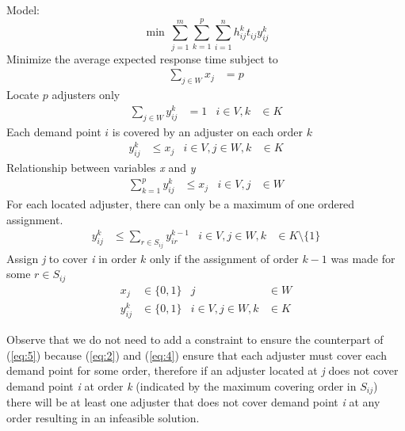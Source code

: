 Model:
{\small
  \begin{equation}
    \min \, \sum_{j=1}^{m}{
      \sum_{k=1}^{p}{
        \sum_{i=1}^{n}{
          h_{ij}^{k}t_{ij}y_{ij}^{k}
        }
      }
    }
  \end{equation}
}
Minimize the average expected response time
subject to
\begin{align}
  \label{eq:2}
  \sum_{j \in W}{x_j}
  & = p
\end{align}
Locate $p$ adjusters only
\begin{align}
  \label{eq:3}
  \sum_{j \in W}{y_{ij}^{k}}
  & = 1
  & i \in V, k
  &\in K
\end{align}
Each demand point $i$ is covered by an adjuster on each order $k$
\begin{align}
  \label{eq:4}
  y_{ij}^{k}
  & \leq x_j
  & i \in V,j \in W, k
  &\in K
\end{align}
Relationship between variables \textit{x} and \textit{y}
\begin{align}
  \label{eq:5}
  \sum_{k = 1}^{p}{
    y_{ij}^{k}
  }
  & \leq x_j
  & i \in V, j 
  & \in W
\end{align}
For each located adjuster,
there can only be
a maximum of one ordered assignment.
\begin{align}
  y_{ij}^{k} 
  & \leq \sum_{r\in S_{ij}}{y_{ir}^{k-1}}
  & i \in V,j \in W, k
  & \in K\setminus\{1\}
\end{align}
Assign \textit{j} to cover \textit{i} in order $k$
only if
the assignment of order $k-1$
was made for some $r \in S_{ij}$
\begin{align}
  x_{j}
  & \in \{0,1\}
  & j 
  & \in W \nonumber
  \\
  y_{ij}^{k}
  & \in \{0,1\}
  &  i \in V,j \in W,k
  &\in K \nonumber
\end{align}

Observe that
we do not need
to add a constraint
to ensure
the counterpart of (\ref{eq:5})
because (\ref{eq:2}) and (\ref{eq:4})
ensure that
each adjuster
must cover each demand point
for some order,
therefore
if an adjuster located at \textit{j}
does not cover demand point \textit{i}
at order \textit{k}
(indicated by
the maximum covering order in $S_{ij}$)
there will be at least
one adjuster
that does not cover
demand point \textit{i}
at any order
resulting in an infeasible solution.
